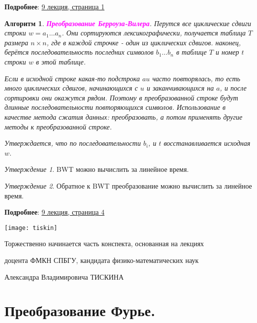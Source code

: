 \documentclass[a4paper]{article}
\theoremstyle{indented}
\newtheorem{alg}{Алгоритм}
\theoremstyle{definition}
\theoremstyle{remark}
\newtheorem{stat}{Утверждение}
\begin{document}
\textbf{Подробнее}: \href{https://users.math-cs.spbu.ru/~okhotin/teaching/algorithms_2020/okhotin_algorithms_2020_l9.pdf}{9 лекция, страница 1} \\

\begin{alg}
    \textcolor{magenta}{\hypertarget{t37}{\textbf{Преобразование Берроуза-Вилера}}}. Перутся все циклические сдвиги строки $w=a_1\ldots a_n$. Они сортируются лексикографически, получается таблица $T$ размера $n\times n$, где в каждой строчке - один из циклических сдвигов. наконец, берётся последовательность последних символов $b_1\ldots b_n$ в таблице $T$ и номер $t$ строки $w$ в этой таблице. \ 

    Если в исходной строке какая-то подстрока $au$ часто повторялась, то есть много циклических сдвигов, начинающихся с $u$ и заканчивающихся на $a$, и после сортировки они окажутся рядом. Поэтому в преобразованной строке будут длинные последовательности повторяющихся символов. Использование в качестве метода сжатия данных: преобразовать, а потом применять другие методы к преобразованной строке. \ 

    Утверждается, что по последовательности $b_i$, и $t$ восстанавливается исходная $w$. 
\end{alg}

\begin{stat}
    BWT можно вычислить за линейное время.
\end{stat}

\begin{stat}
    Обратное к BWT преобразование можно вычислить за линейное время.
\end{stat}

\textbf{Подробнее}: \href{https://users.math-cs.spbu.ru/~okhotin/teaching/algorithms_2020/okhotin_algorithms_2020_l9.pdf}{9 лекция, страница 4}

\newpage

\begin{center}
\texttt{[image: tiskin]}

Торжественно начинается часть конспекта, основанная на лекциях \ 

доцента ФМКН СПБГУ, кандидата физико-математических наук \ 

Александра Владимировича ТИСКИНА 
\end{center}

\section{Преобразование Фурье.}
\end{document}
